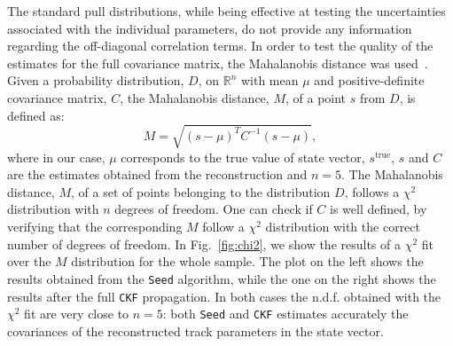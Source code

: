 The standard pull distributions, while being effective at testing the uncertainties associated with the individual parameters, do not provide any information regarding the off-diagonal correlation terms. In order to test the quality of the estimates for the full covariance matrix, the Mahalanobis distance was used~\cite{M-distance}. Given a probability distribution, $D$, on $\mathbb{R}^n$ with mean $\mu$ and positive-definite covariance matrix, $C$, the Mahalanobis distance, $M$, of a point $s$ from $D$, is defined as:
\begin{equation}
    M = \sqrt{(s-\mu)^TC^{-1}(s-\mu)},
\end{equation}
where in our case, $\mu$ corresponds to the true value of state vector, $s^{\text{true}}$, $s$ and $C$ are the estimates obtained from the reconstruction and $n=5$. The Mahalanobis distance, $M$, of a set of points belonging to the distribution $D$, follows a $\chi^2$ distribution with $n$ degrees of freedom. One can check if $C$ is well defined, by verifying that the corresponding $M$ follow a $\chi^2$ distribution with the correct number of degrees of freedom. In Fig.~\ref{fig:chi2}, we show the results of a $\chi^2$ fit over the $M$ distribution for the whole sample. The plot on the left shows the results obtained from the \texttt{Seed} algorithm, while the one on the right shows the results after the full \texttt{CKF} propagation. In both cases the n.d.f. obtained with the $\chi^2$ fit are very close to $n=5$: both \texttt{Seed} and \texttt{CKF} estimates accurately the covariances of the reconstructed track parameters in the state vector. 


